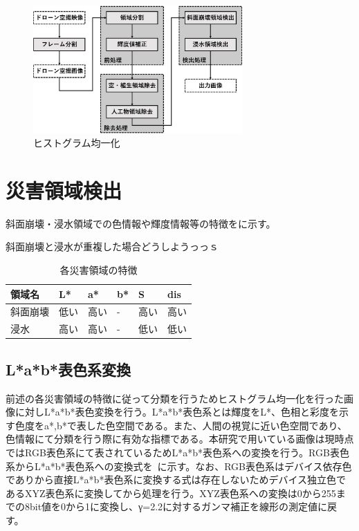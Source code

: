 \documentclass[../Thesis]{subfiles}
\begin{document}
	\begin{figure}[h]
		\centering
		\includegraphics[width=8cm]{img/howto3.jpg}
		\caption{ヒストグラム均一化}
		\label{img03}
  \end{figure}


\section{災害領域検出}
  斜面崩壊・浸水領域での色情報や輝度情報等の特徴をに示す。

  斜面崩壊と浸水が重複した場合どうしようっっｓ
    
  \begin{table}[h]
    \centering
    \caption{各災害領域の特徴}
    \label{tab01}
    \begin{tabular}{l l l l l l}
      領域名 & L* & a* & b* & S & dis \\
      \hline
      \hline
      斜面崩壊 & 低い & 高い & - & 高い & 高い \\
      浸水 & 高い & 高い & - & 低い & 低い \\
    \end{tabular}
  \end{table}

\subsection{L*a*b*表色系変換}
  前述の各災害領域の特徴に従って分類を行うためヒストグラム均一化を行った画像に対しL*a*b*表色変換を行う。L*a*b*表色系とは輝度をL*、色相と彩度を示す色度をa*,b*で表した色空間である。また、人間の視覚に近い色空間であり、色情報にて分類を行う際に有効な指標である。本研究で用いている画像は現時点ではRGB表色系にて表されているためL*a*b*表色系への変換を行う。RGB表色系からL*a*b*表色系への変換式を{}~{}に示す。なお、RGB表色系はデバイス依存色でありから直接L*a*b*表色系に変換する式は存在しないためデバイス独立色であるXYZ表色系に変換してから処理を行う。XYZ表色系への変換は0から255までの8bit値を0から1に変換し、γ=2.2に対するガンマ補正を線形の測定値に戻す。
  
\end{document}
